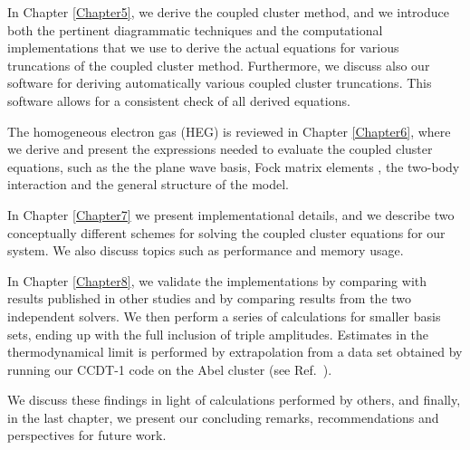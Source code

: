In Chapter \ref{Chapter5}, we derive the coupled cluster method, and
we introduce both the pertinent diagrammatic techniques and the computational
implementations that we use to derive the actual equations
for various truncations of the coupled cluster method. Furthermore, we discuss also
our software for deriving automatically various coupled cluster truncations. This software allows for a
consistent check of all derived equations.

The homogeneous electron gas (HEG) is reviewed in
Chapter \ref{Chapter6}, where we derive and present the expressions needed
to evaluate the coupled cluster equations, such as the the plane wave
basis, Fock matrix elements \cite{Thijssen}, the two-body
interaction \cite{ShavittBartlett2009} and the general structure of
the model. 

In Chapter \ref{Chapter7} we present implementational details, and we
describe two conceptually different schemes for solving the coupled
cluster equations for our system. We also discuss topics such as
performance and memory usage.

In Chapter \ref{Chapter8}, we validate the implementations
by comparing with results published in other studies and by comparing
results from the two independent solvers. We then perform a series of
calculations for smaller basis sets, ending up with the full inclusion
of triple amplitudes. Estimates in the thermodynamical limit is
performed by extrapolation from a data set obtained by running our
CCDT-1 code on the Abel cluster (see Ref.~\cite{abel}).

We discuss these findings in light of calculations performed by
others, and finally, in the last chapter,  we present  our concluding remarks, recommendations
and perspectives for future work.












